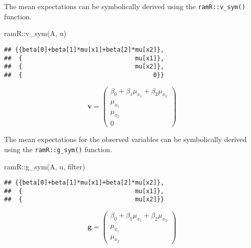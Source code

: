 \documentclass[
]{book}
\newenvironment{Shaded}{\begin{snugshade}}{\end{snugshade}}
\newcommand{\FunctionTok}[1]{\textcolor[rgb]{0.00,0.00,0.00}{#1}}
\newcommand{\NormalTok}[1]{#1}
\newcommand{\SpecialCharTok}[1]{\textcolor[rgb]{0.00,0.00,0.00}{#1}}
\theoremstyle{definition}
\theoremstyle{definition}
\theoremstyle{definition}
\theoremstyle{remark}
\begin{document}
The mean expectations
can be symbolically derived using the \texttt{ramR::v\_sym()} function.

\begin{Shaded}
\begin{Highlighting}[]
\NormalTok{ramR}\SpecialCharTok{::}\FunctionTok{v\_sym}\NormalTok{(A, u)}
\end{Highlighting}
\end{Shaded}

\begin{verbatim}
## {{beta[0]+beta[1]*mu[x1]+beta[2]*mu[x2]},
##  {                               mu[x1]},
##  {                               mu[x2]},
##  {                                    0}}
\end{verbatim}

\begin{equation*}\mathbf{v} =\left( \begin{array}{c} \beta  _{0} + \beta  _{1} \mu  _{x_{1}} + \beta  _{2} \mu  _{x_{2}} \\ \mu  _{x_{1}} \\ \mu  _{x_{2}} \\ 0 \end{array} \right)\end{equation*}

The mean expectations for the observed variables
can be symbolically derived using the \texttt{ramR::g\_sym()} function.

\begin{Shaded}
\begin{Highlighting}[]
\NormalTok{ramR}\SpecialCharTok{::}\FunctionTok{g\_sym}\NormalTok{(A, u, filter)}
\end{Highlighting}
\end{Shaded}

\begin{verbatim}
## {{beta[0]+beta[1]*mu[x1]+beta[2]*mu[x2]},
##  {                               mu[x1]},
##  {                               mu[x2]}}
\end{verbatim}

\begin{equation*}\mathbf{g} =\left( \begin{array}{c} \beta  _{0} + \beta  _{1} \mu  _{x_{1}} + \beta  _{2} \mu  _{x_{2}} \\ \mu  _{x_{1}} \\ \mu  _{x_{2}} \end{array} \right)\end{equation*}
\end{document}
